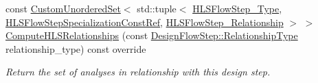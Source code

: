\begin{DoxyCompactItemize}
const \hyperlink{classCustomUnorderedSet}{Custom\+Unordered\+Set}$<$ std\+::tuple$<$ \hyperlink{hls__step_8hpp_ada16bc22905016180e26fc7e39537f8d}{H\+L\+S\+Flow\+Step\+\_\+\+Type}, \hyperlink{hls__step_8hpp_a5fdd2edf290c196531d21d68e13f0e74}{H\+L\+S\+Flow\+Step\+Specialization\+Const\+Ref}, \hyperlink{hls__step_8hpp_a3ad360b9b11e6bf0683d5562a0ceb169}{H\+L\+S\+Flow\+Step\+\_\+\+Relationship} $>$ $>$ \hyperlink{classallocation_a164671812f520839974efb00b03e79e2}{Compute\+H\+L\+S\+Relationships} (const \hyperlink{classDesignFlowStep_a723a3baf19ff2ceb77bc13e099d0b1b7}{Design\+Flow\+Step\+::\+Relationship\+Type} relationship\+\_\+type) const override
\begin{DoxyCompactList}\small\item\em Return the set of analyses in relationship with this design step. \end{DoxyCompactList}\end{DoxyCompactItemize}
